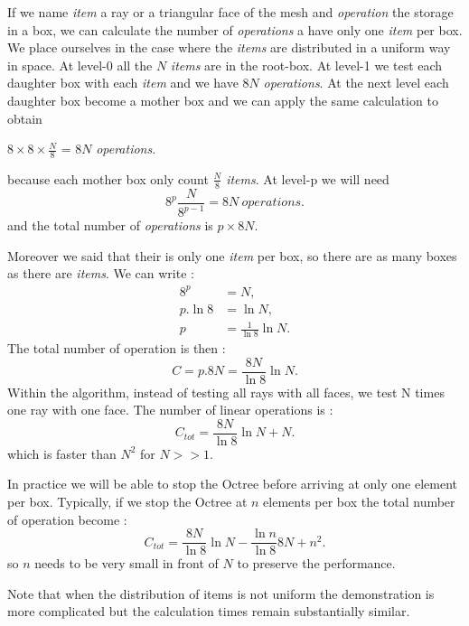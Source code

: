 \documentclass[AMA,STIX1COL]{WileyNJD-v2}
\begin{document}
If we name \textit{item} a ray or a triangular face of the mesh and \textit{operation} the storage in a box, we can calculate the number of \textit{operations} a have only one \textit{item} per box. We place ourselves in the case where the \textit{items} are distributed in a uniform way in space. At level-0 all the $N$ \textit{items} are in the root-box. At level-1 we test each daughter box with each \textit{item} and we have $8N$ \textit{operations}. At the next level each daughter box become a mother box and we can apply the same calculation to obtain
\begin{center}
$8\times 8\times \frac{N}{8}$ = $8N$ \textit{operations}.
\end{center}
because each mother box only count $\frac{N}{8}$ \textit{items}. At level-p we will need  
%
\begin{equation} \label{operation}
8^p\frac{N}{8^{p-1}} = 8N \ \textit{operations}.
\end{equation}
%
and the total number of \textit{operations} is $p\times 8N$.

Moreover we said that their is only one \textit{item} per box, so there are as many boxes as there are \textit{items}. We can write :
%
\begin{align}  \label{nbEtage}
8^p &= N \nonumber, \\
p.\ln{8} &= \ln{N} \nonumber, \\
p &= \frac{1}{\ln{8}}\ln{N}.
\end{align}
%
The total number of operation is then :
\begin{equation}
C = p.8N = \frac{8N}{\ln8}\ln{N}.
\end{equation}
%
Within the algorithm, instead of testing all rays with all faces, we test N times one ray with one face. The number of linear operations is :
\begin{equation}
C_{tot} =  \frac{8N}{\ln8}\ln{N} + N.
\end{equation}
which is faster than $N^2$ for $N>>1$.

In practice we will be able to stop the Octree before arriving at only one element per box. Typically, if we stop the Octree at $n$ elements per box the total number of operation become :
\begin{equation}
C_{tot} = \frac{8N}{\ln8}\ln{N} - \frac{\ln n }{\ln8}8N + n^2.
\end{equation}
so $n$ needs to be very small in front of $N$ to preserve the performance.

Note that when the distribution of items is not uniform the demonstration is more complicated but the calculation times remain substantially similar.
\end{document}
